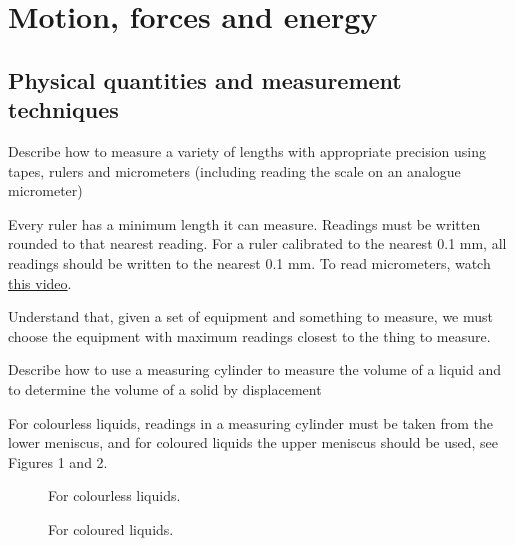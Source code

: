 \section{Motion, forces and energy}
\subsection{Physical quantities and measurement techniques}

\begin{point}
Describe how to measure a variety of lengths with appropriate precision using tapes, rulers and 
micrometers (including reading the scale on an analogue micrometer)
\end{point}

Every ruler has a minimum length it can measure. Readings must be written rounded to that nearest
reading. For a ruler calibrated to the nearest 0.1 mm, all readings should be written to the 
nearest 0.1 mm.
To read micrometers, watch \href{https://youtu.be/StBc56ZifMs}{\color{blue}this video}.

\smallskip
Understand that, given a set of equipment and something to measure, we must choose the equipment
with maximum readings closest to the thing to measure.

\begin{point}
Describe how to use a measuring cylinder to measure the volume of a liquid and to determine the volume 
of a solid by displacement
\end{point}

For colourless liquids, readings in a measuring cylinder must be taken from the lower meniscus,
and for coloured liquids the upper meniscus should be used, see Figures 1 and 2.


\begin{figure}
	\centering


	\caption{For colourless liquids.}
\end{figure}

\begin{figure}
	\centering


	\caption{For coloured liquids.}
\end{figure}

